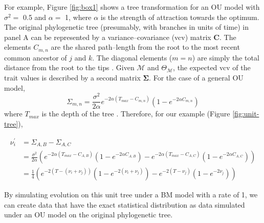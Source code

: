 \documentclass[a4paper,12pt]{article}
\begin{document}
For example, Figure \ref{fig:box1} shows a tree transformation for an OU model with $\sigma^2=$ 0.5 and $\alpha =$ 1, where $\alpha$ is the strength of attraction towards the optimum. The original phylogenetic tree (presumably, with branches in units of time) in panel A can be represented by a variance--covariance (vcv) matrix $\mathbf{C}$. The elements $C_{m,n}$ are the shared path--length from the root to the most recent common ancestor of $j$ and $k$. The diagonal elements ($m = n$) are simply the total distance from the root to the tips \citep{Omeara2006}. Given $\mathcal{M}$ and $\Theta_{\mathcal{M}}$, the expected vcv of the trait values is described by a second matrix $\mathbf{\Sigma}$. For the case of a general OU model,
\begin{equation}
\Sigma_{m,n} = \frac{\sigma^2}{2\alpha} e^{-2\alpha (T_{max} - C_{m,n})} (1 - e^{-2\alpha C_{m,n}})
\end{equation} 
where $T_{max}$ is the depth of the tree \citep{Hansen1997, ButlerKing2004}. Therefore, for our example (Figure \ref{fig:unit-tree}), 

\begin{align*}
  \nu_i^\prime &= \Sigma_{A,B} - \Sigma_{A,C}  \\ 
&= \frac{\sigma^2}{2\alpha} \left(e^{-2\alpha (T_{max} - C_{A,B})} (1 -e^{-2\alpha C_{A,B}})
- e^{-2 \alpha (T_{max} - C_{A,C})} (1 - e^{-2\alpha C_{A,C}}) \right)  \\
&= \frac{1}{4} \left( e^{-2 (T - (\nu_i + \nu_j))} (1 - e^{-2 (\nu_i + \nu_j)})
- e^{-2 (T - \nu_j)} (1 - e^{-2 \nu_j}) \right) 
\end{align*}

By simulating evolution on this unit tree under a BM model with a rate of 1, we can create data that have the exact statistical distribution as data simulated under an OU model on the original phylogenetic tree.


\newpage


\end{document}

